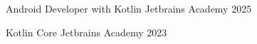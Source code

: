 \begin{cvhonors}

    \cvhonor
    {Android Developer with Kotlin}
    {Jetbrains Academy}
    {}
    {2025}

    \cvhonor
    {Kotlin Core}
    {Jetbrains Academy}
    {}
    {2023}
\end{cvhonors}
